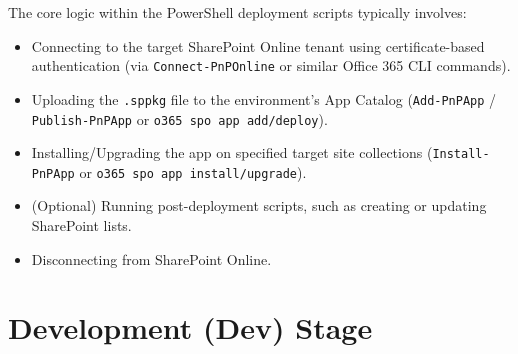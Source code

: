 The core logic within the PowerShell deployment scripts typically involves:
\begin{itemize}
    \item Connecting to the target SharePoint Online tenant using certificate-based authentication (via \texttt{Connect-PnPOnline} or similar Office 365 CLI commands).
    \item Uploading the \texttt{.sppkg} file to the environment's App Catalog (\texttt{Add-PnPApp} / \texttt{Publish-PnPApp} or \texttt{o365 spo app add/deploy}).
    \item Installing/Upgrading the app on specified target site collections (\texttt{Install-PnPApp} or \texttt{o365 spo app install/upgrade}).
    \item (Optional) Running post-deployment scripts, such as creating or updating SharePoint lists.
    \item Disconnecting from SharePoint Online.
\end{itemize}

\section{Development (Dev) Stage}
\label{sec:DevStage}

